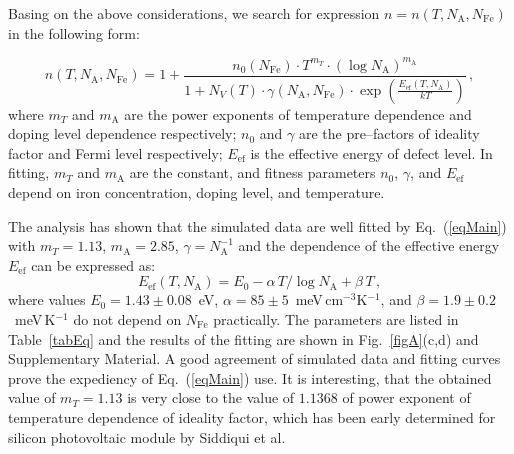 \documentclass [sort&compress] {elsarticle}
\begin{document}
Basing on the above considerations, we search for expression $n=n(T,N_\mathrm{A},N_\mathrm{Fe})$ in the following form:

\begin{equation}
\label{eqMain}
    n(T,N_\mathrm{A},N_\mathrm{Fe})=1+\frac{n_0(N_\mathrm{Fe})\cdot T^{m_T}\cdot(\log N_\mathrm{A})^{m_\mathrm{A}}}
        {1+N_V(T)\cdot\gamma(N_\mathrm{A},N_\mathrm{Fe})\cdot\exp\left(\frac{E_\mathrm{ef}(T,N_\mathrm{A})}{kT}\right)}\,,
\end{equation}
where
$m_T$ and $m_\mathrm{A}$ are the power exponents of temperature dependence and doping level dependence respectively;
$n_0$ and $\gamma$ are the pre--factors of ideality factor and Fermi level respectively;
$E_\mathrm{ef}$ is the effective energy of defect level.
In fitting,
$m_T$ and $m_\mathrm{A}$ are the constant,
and fitness parameters $n_0$, $\gamma$, and $E_\mathrm{ef}$ depend on iron concentration, doping level, and temperature.


The analysis has shown that the simulated data are well fitted by Eq.~(\ref{eqMain}) with $m_T=1.13$, $m_\mathrm{A}=2.85$, $\gamma=N_\mathrm{A}^{-1}$
and the dependence of the effective energy $E_\mathrm{ef}$ can be expressed as:
\begin{equation}
\label{eqEf-FISRH}
    E_\mathrm{ef}(T,N_\mathrm{A})=E_0-\alpha\, T / \log N_\mathrm{A}+\beta \,T\,,
\end{equation}
where
values $E_0=1.43\pm0.08$~eV, $\alpha=85\pm5$~meV$\,$cm$^{-3}$K$^{-1}$, and $\beta=1.9\pm0.2$~meV$\,$K$^{-1}$ do not depend on $N_\mathrm{Fe}$ practically.
The parameters are listed in Table~\ref{tabEq} and the results of the fitting are shown in Fig.~\ref{figA}(c,d) and Supplementary Material.
A good agreement of simulated data and fitting curves prove the expediency of Eq.~(\ref{eqMain}) use.
It is interesting, that the obtained  value of $m_T=1.13$ is very close to the value of $1.1368$ of power exponent of temperature dependence of ideality factor, which has
been early  determined for silicon  photovoltaic module by Siddiqui et al.\cite{USAMASIDDIQUI}
\end{document}
